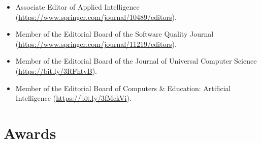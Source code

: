 \documentclass[a4paper,8pt]{article} %
\begin{document}
\begin{itemize}
	\item Associate Editor of Applied Intelligence (\url{https://www.springer.com/journal/10489/editors}). 
	\item Member of the Editorial Board of the Software Quality Journal (\url{https://www.springer.com/journal/11219/editors}).
	\item Member of the Editorial Board of the Journal of Universal Computer Science (\url{https://bit.ly/3RFhtvB}).
	\item Member of the Editorial Board of Computers \& Education: Artificial Intelligence (\url{https://bit.ly/3fMckVi}).
\end{itemize}



\section{Awards}

\end{document}
